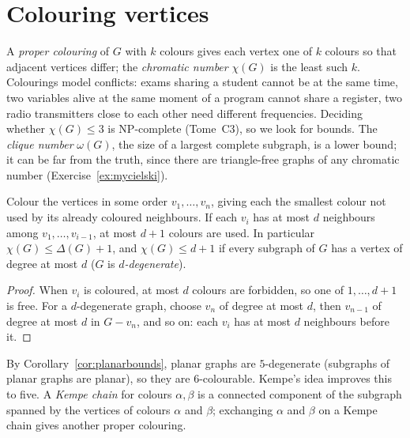 \section{Colouring vertices}

A \emph{proper colouring} of $G$ with $k$ colours gives each vertex one of $k$ colours so that adjacent vertices differ; the \emph{chromatic number} $\chi(G)$ is the
least such $k$. Colourings model conflicts: exams sharing a student cannot be at the same time, two variables alive at the same moment of
a program cannot share a register, two radio transmitters close to each other need different frequencies. Deciding whether $\chi(G)\le3$ is
NP-complete (Tome~C3), so we look for bounds. The \emph{clique number} $\omega(G)$, the size of a largest complete subgraph, is a lower bound; it can be far
from the truth, since there are triangle-free graphs of any chromatic number (Exercise~\ref{ex:mycielski}).

\begin{proposition}\label{prop:greedy}
Colour the vertices in some order $v_1,\dots,v_n$, giving each the smallest colour not used by its already coloured neighbours. If each $v_i$ has at most $d$
neighbours among $v_1,\dots,v_{i-1}$, at most $d+1$ colours are used. In particular $\chi(G)\le\Delta(G)+1$, and $\chi(G)\le d+1$ if every subgraph of $G$ has a vertex of
degree at most $d$ ($G$ is \emph{$d$-degenerate}).
\end{proposition}
\begin{proof}
When $v_i$ is coloured, at most $d$ colours are forbidden, so one of $1,\dots,d+1$ is free. For a $d$-degenerate graph, choose $v_n$ of degree at most $d$, then $v_{n-1}$ of
degree at most $d$ in $G-v_n$, and so on: each $v_i$ has at most $d$ neighbours before it.
\end{proof}

By Corollary~\ref{cor:planarbounds}, planar graphs are $5$-degenerate (subgraphs of planar graphs are planar), so they are $6$-colourable. Kempe's idea
improves this to five. A \emph{Kempe chain} for colours $\alpha,\beta$ is a connected component of the subgraph spanned by the vertices of colours $\alpha$ and $\beta$; exchanging
$\alpha$ and $\beta$ on a Kempe chain gives another proper colouring.

